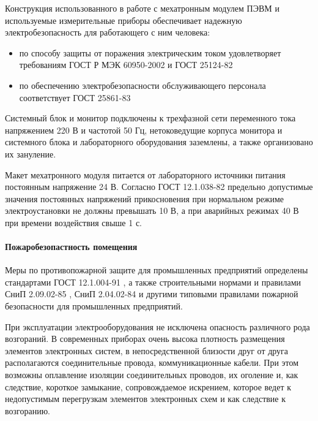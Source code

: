 Конструкция использованного в работе с мехатронным модулем ПЭВМ и используемые
измерительные приборы обеспечивает надежную электробезопасность для работающего
с ним человека:

\begin{itemize}
    \item   по способу защиты от поражения электрическим током удовлетворяет
            требованиям ГОСТ Р МЭК 60950-2002 \cite{ecology_gost_60950_2002}
            и ГОСТ 25124-82 \cite{ecology_gost_25124_82}

    \item   по обеспечению электробезопасности обслуживающего персонала
            соответствует ГОСТ 25861-83 \cite{ecology_gost_25861_83}
\end{itemize}

Системный блок и монитор подключены к трехфазной сети переменного тока напряжением
220 В и частотой 50 Гц, нетоковедущие корпуса монитора и системного блока и лабораторного
оборудования заземлены, а также организовано их зануление.

Макет мехатронного модуля питается от лабораторного источники питания постоянным
напряжение 24 В. Согласно ГОСТ 12.1.038-82 \cite{ecology_gost_038_82}
предельно допустимые значения постоянных напряжений прикосновения при нормальном
режиме электроустановки не должны превышать 10 В, а при аварийных режимах 40 В
при времени воздействия свыше 1 с.

\paragraph{Пожаробезопастность помещения}

Меры по противопожарной защите для промышленных предприятий определены стандартами
ГОСТ 12.1.004-91 \cite{ecology_gost_004_91}, а также строительными нормами
и правилами СниП 2.09.02-85 \cite{ecology_snip_02_85}, СниП 2.04.02-84
\cite{ecology_snip_02_84} и другими типовыми правилами пожарной безопасности для
промышленных предприятий.

При эксплуатации электрооборудования не исключена опасность различного рода возгораний.
В современных приборах очень высока плотность размещения элементов электронных
систем, в непосредственной близости друг от друга располагаются соединительные
провода, коммуникационные кабели. При этом возможны оплавление изоляции соединительных
проводов, их оголение и, как следствие, короткое замыкание, сопровождаемое искрением,
которое ведет к недопустимым перегрузкам элементов электронных схем и как следствие
к возгоранию.


